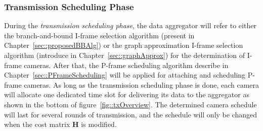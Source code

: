 {\subsubsection{Transmission Scheduling Phase}
During the \emph{transmission scheduling phase}, the data aggregator will refer to either the branch-and-bound I-frame selection algorithm (present in Chapter~\ref{sec::proposedBBAlg}) or the graph approximation I-frame selection algorithm (introduce in Chapter~\ref{sec::graphApprox}) for the determination of I-frame cameras.
After that, the P-frame scheduling algorithm describe in Chapter~\ref{sec::PFrameScheduling} will be applied for attaching and scheduling P-frame cameras.
As long as the transmission scheduling phase is done, each camera will allocate one dedicated time slot for delivering its data to the aggregator as shown in the bottom of figure~\ref{fig::txOverview}.
The determined camera schedule will last for several rounds of transmission, and the schedule will only be changed when the cost matrix $\mathbf{H}$ is modified.
%
}
